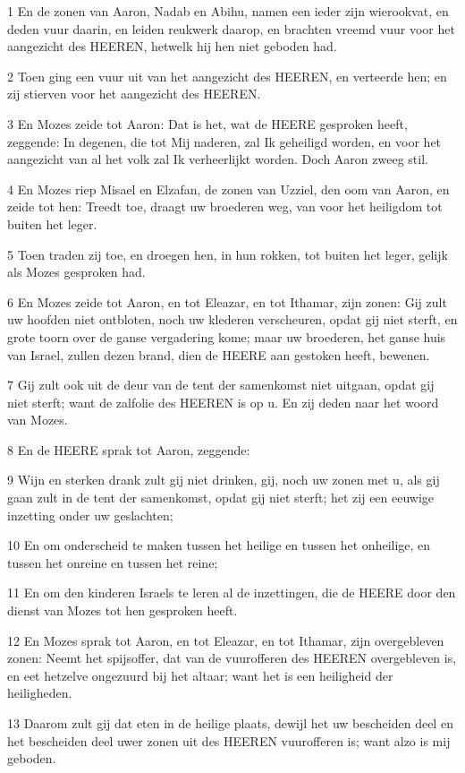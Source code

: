 \par 1 En de zonen van Aaron, Nadab en Abihu, namen een ieder zijn wierookvat, en deden vuur daarin, en leiden reukwerk daarop, en brachten vreemd vuur voor het aangezicht des HEEREN, hetwelk hij hen niet geboden had.
\par 2 Toen ging een vuur uit van het aangezicht des HEEREN, en verteerde hen; en zij stierven voor het aangezicht des HEEREN.
\par 3 En Mozes zeide tot Aaron: Dat is het, wat de HEERE gesproken heeft, zeggende: In degenen, die tot Mij naderen, zal Ik geheiligd worden, en voor het aangezicht van al het volk zal Ik verheerlijkt worden. Doch Aaron zweeg stil.
\par 4 En Mozes riep Misael en Elzafan, de zonen van Uzziel, den oom van Aaron, en zeide tot hen: Treedt toe, draagt uw broederen weg, van voor het heiligdom tot buiten het leger.
\par 5 Toen traden zij toe, en droegen hen, in hun rokken, tot buiten het leger, gelijk als Mozes gesproken had.
\par 6 En Mozes zeide tot Aaron, en tot Eleazar, en tot Ithamar, zijn zonen: Gij zult uw hoofden niet ontbloten, noch uw klederen verscheuren, opdat gij niet sterft, en grote toorn over de ganse vergadering kome; maar uw broederen, het ganse huis van Israel, zullen dezen brand, dien de HEERE aan gestoken heeft, bewenen.
\par 7 Gij zult ook uit de deur van de tent der samenkomst niet uitgaan, opdat gij niet sterft; want de zalfolie des HEEREN is op u. En zij deden naar het woord van Mozes.
\par 8 En de HEERE sprak tot Aaron, zeggende:
\par 9 Wijn en sterken drank zult gij niet drinken, gij, noch uw zonen met u, als gij gaan zult in de tent der samenkomst, opdat gij niet sterft; het zij een eeuwige inzetting onder uw geslachten;
\par 10 En om onderscheid te maken tussen het heilige en tussen het onheilige, en tussen het onreine en tussen het reine;
\par 11 En om den kinderen Israels te leren al de inzettingen, die de HEERE door den dienst van Mozes tot hen gesproken heeft.
\par 12 En Mozes sprak tot Aaron, en tot Eleazar, en tot Ithamar, zijn overgebleven zonen: Neemt het spijsoffer, dat van de vuurofferen des HEEREN overgebleven is, en eet hetzelve ongezuurd bij het altaar; want het is een heiligheid der heiligheden.
\par 13 Daarom zult gij dat eten in de heilige plaats, dewijl het uw bescheiden deel en het bescheiden deel uwer zonen uit des HEEREN vuurofferen is; want alzo is mij geboden.
